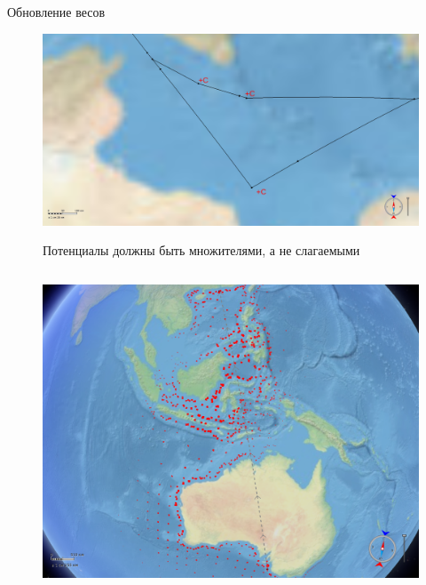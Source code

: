 \documentclass[russian, hyperref={unicode}]{beamer}
\begin{document}
\begin{frame}[noframenumbering]{Обновление весов}
     {
        \begin{figure}
            \includegraphics[width=\textwidth]{Solution/potentials-multipliers}

            Потенциалы должны быть множителями, а не слагаемыми
        \end{figure}
    }
 
     {
        \begin{columns}
            \begin{figure}
                \includegraphics[clip=true, trim = 280pt 0 20pt 0, width=\textwidth]{Solution/potentials-update/accum1}
            \end{figure}


\end{columns}}
\end{frame}
\end{document}
